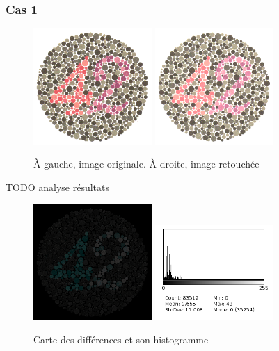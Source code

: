 \documentclass[a4paper]{article}
\begin{document}
\clearpage
\subsubsection{Cas 1}

\begin{figure}[H]
\begin{center}
\includegraphics[width=170px]{../base/cas_1_dalton42.png}
\includegraphics[width=170px]{../resultats/e2_q3_2_modif.png}
\end{center}
\caption{À gauche, image originale. À droite, image retouchée}
\end{figure}

TODO analyse résultats

\begin{figure}[H]
\begin{center}
\includegraphics[width=170px]{../resultats/e2_q3_2_diff.png}
\includegraphics[width=170px]{../resultats/e2_q3_2_diff_hist.png}
\end{center}
\caption{Carte des différences et son histogramme}
\end{figure}
\end{document}
